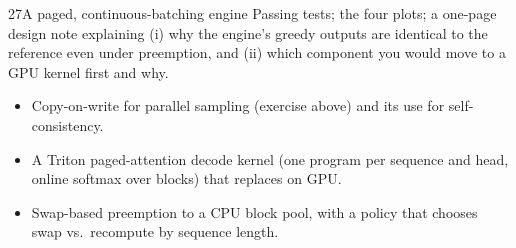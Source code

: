 \begin{labbox}{27}{A paged, continuous-batching engine}
Passing tests; the four plots; a one-page design note explaining (i) why the engine's greedy outputs
are identical to the reference even under preemption, and (ii) which component you would move to a GPU
kernel first and why.

\begin{itemize}
  \item Copy-on-write  for parallel sampling (exercise above) and its use for self-consistency.
  \item A Triton paged-attention decode kernel (one program per sequence and head, online softmax over
    blocks) that replaces  on GPU.
  \item Swap-based preemption to a CPU block pool, with a policy that chooses swap vs.\ recompute by
    sequence length.
\end{itemize}
\end{labbox}

